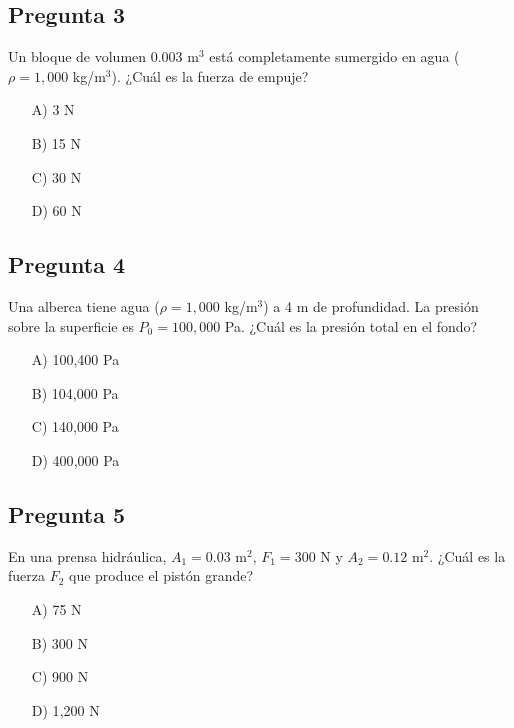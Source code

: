 \begin{preguntabox}
\subsection*{Pregunta 3}
Un bloque de volumen 0.003 m$^3$ está completamente sumergido en agua ($\rho = 1{,}000$ kg/m$^3$). ¿Cuál es la fuerza de empuje?

\begin{enumerate}
    \item[A)] 3 N
    \item[B)] 15 N
    \item[C)] 30 N
    \item[D)] 60 N
\end{enumerate}
\end{preguntabox}

\begin{preguntabox}
\subsection*{Pregunta 4}
Una alberca tiene agua ($\rho = 1{,}000$ kg/m$^3$) a 4 m de profundidad. La presión sobre la superficie es $P_0 = 100{,}000$ Pa. ¿Cuál es la presión total en el fondo?

\begin{enumerate}
    \item[A)] 100{,}400 Pa
    \item[B)] 104{,}000 Pa
    \item[C)] 140{,}000 Pa
    \item[D)] 400{,}000 Pa
\end{enumerate}
\end{preguntabox}
\newpage
\begin{preguntabox}
\subsection*{Pregunta 5}
En una prensa hidráulica, $A_1 = 0.03$ m$^2$, $F_1 = 300$ N y $A_2 = 0.12$ m$^2$. ¿Cuál es la fuerza $F_2$ que produce el pistón grande?

\begin{enumerate}
    \item[A)] 75 N
    \item[B)] 300 N
    \item[C)] 900 N
    \item[D)] 1{,}200 N
\end{enumerate}
\end{preguntabox}

